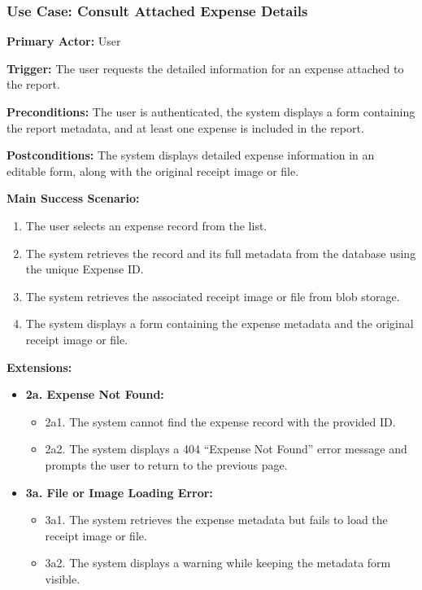 \subsubsection{\textbf{Use Case: Consult Attached Expense Details}}

\textbf{Primary Actor:} User

\textbf{Trigger:} The user requests the detailed information for an expense attached to the report.

\textbf{Preconditions:} The user is authenticated, the system displays a form containing the report metadata, and at least one expense is included in the report.

\textbf{Postconditions:} The system displays detailed expense information in an editable form, along with the original receipt image or file.

\vspace{0.5cm}

\textbf{Main Success Scenario:}

\begin{enumerate} [leftmargin=0.75cm, noitemsep]
\item The user selects an expense record from the list.
\item The system retrieves the record and its full metadata from the database using the unique Expense ID.
\item The system retrieves the associated receipt image or file from blob storage.
\item The system displays a form containing the expense metadata and the original receipt image or file.
\end{enumerate}

\vspace{0.3cm}

\textbf{Extensions:}

\begin{itemize} [label={}, leftmargin=0.75cm, noitemsep]

    \item \textbf{2a. Expense Not Found:}
    \begin{itemize} [label={}, leftmargin=0.75cm, noitemsep]
        \item 2a1. The system cannot find the expense record with the provided ID.
        \item 2a2. The system displays a 404 ``Expense Not Found'' error message and prompts the user to return to the previous page.
    \end{itemize}

    \item \textbf{3a. File or Image Loading Error:}
    \begin{itemize} [label={}, leftmargin=0.75cm, noitemsep]
        \item 3a1. The system retrieves the expense metadata but fails to load the receipt image or file.
        \item 3a2. The system displays a warning while keeping the metadata form visible.
    \end{itemize}

\end{itemize}

\vspace{0.3cm}

